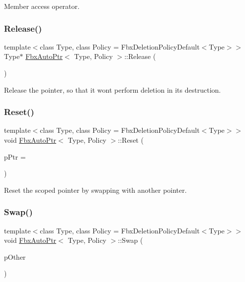 Member access operator. 

\mbox{\label{class_fbx_auto_ptr_ab9460afa835fdaa907bf0ae32f939b8e}} 
\subsubsection{\texorpdfstring{Release()}{Release()}}
{\footnotesize\ttfamily template$<$class Type, class Policy = Fbx\+Deletion\+Policy\+Default$<$\+Type$>$$>$ \\
Type$\ast$ \hyperlink{class_fbx_auto_ptr}{Fbx\+Auto\+Ptr}$<$ Type, Policy $>$\+::Release (\begin{DoxyParamCaption}{ }\end{DoxyParamCaption})}



Release the pointer, so that it won\textquotesingle{}t perform deletion in its destruction. 

\mbox{\label{class_fbx_auto_ptr_ab0b755d84668c33b007a3311adb2b9e1}} 
\subsubsection{\texorpdfstring{Reset()}{Reset()}}
{\footnotesize\ttfamily template$<$class Type, class Policy = Fbx\+Deletion\+Policy\+Default$<$\+Type$>$$>$ \\
void \hyperlink{class_fbx_auto_ptr}{Fbx\+Auto\+Ptr}$<$ Type, Policy $>$\+::Reset (\begin{DoxyParamCaption}\item[{Type $\ast$}]{p\+Ptr = {} }\end{DoxyParamCaption})}



Reset the scoped pointer by swapping with another pointer. 

\mbox{\label{class_fbx_auto_ptr_a46656f93e4ec91ece72fb90b9091fd2c}} 
\subsubsection{\texorpdfstring{Swap()}{Swap()}}
{\footnotesize\ttfamily template$<$class Type, class Policy = Fbx\+Deletion\+Policy\+Default$<$\+Type$>$$>$ \\
void \hyperlink{class_fbx_auto_ptr}{Fbx\+Auto\+Ptr}$<$ Type, Policy $>$\+::Swap (\begin{DoxyParamCaption}\item[{\hyperlink{class_fbx_auto_ptr}{Fbx\+Auto\+Ptr}$<$ Type, Policy $>$ \&}]{p\+Other }\end{DoxyParamCaption})}



